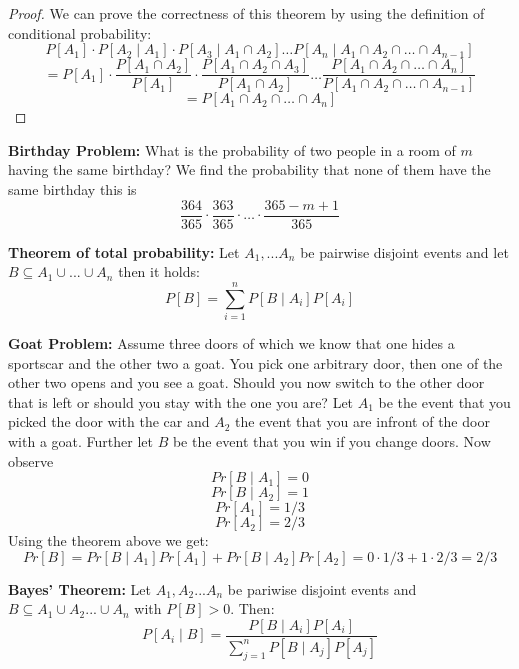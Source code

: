 \begin{proof}
	We can prove the correctness of this theorem by using the definition of conditional probability:
	$$P[A_1] \cdot P[A_2 \mid A_1] \cdot P[A_3 \mid A_1 \cap A_2] \dots P[A_n \mid A_1 \cap A_2 \cap \dots \cap A_{n-1}]$$
	$$ = P[A_1] \cdot \frac{P[A_1 \cap A_2]}{P[A_1]} \cdot \frac{P[A_1 \cap A_2 \cap A_3]}{P[A_1 \cap A_2]} \dots \frac{P[A_1 \cap A_2 \cap \dots \cap A_n]}{P[A_1 \cap A_2 \cap \dots \cap A_{n-1}]}$$
	$$ = P[A_1 \cap A_2 \cap \dots \cap A_n]$$
\end{proof}

\begin{example}
	\textbf{Birthday Problem: } What is the probability of two people in a room of $m$ having the same birthday? We find the probability that none of them have the same birthday this is
	$$\frac{364}{365} \cdot \frac{363}{365} \cdot \dots \cdot \frac{365-m+1}{365}$$
\end{example}

\begin{theorem}
	\textbf{Theorem of total probability: }Let $A_1, ... A_n$ be pairwise disjoint events and let $B \subseteq A_1 \cup ... \cup A_n$ then it holds:
	$$P[B] = \sum_{i=1}^n P[B \mid A_i] P[A_i]$$
\end{theorem}

\begin{example}
	\textbf{Goat Problem: } Assume three doors of which we know that one hides a sportscar and the other two a goat. You pick one arbitrary door, then one of the other two opens and you see a goat. Should you now switch to the other door that is left or should you stay with the one you are?
	Let $A_1$ be the event that you picked the door with the car and $A_2$ the event that you are infront of the door with a goat. Further let $B$ be the event that you win if you change doors. Now observe
	$$Pr[B \mid A_1] = 0$$
	$$Pr[B \mid A_2] = 1$$
	$$Pr[A_1] = 1/3$$
	$$Pr[A_2] = 2/3$$
	Using the theorem above we get:
	$$Pr[B] = Pr[B \mid A_1] Pr[A_1] + Pr[B \mid A_2] Pr[A_2] = 0 \cdot 1/3 + 1 \cdot 2/3 = 2/3$$
\end{example}

\begin{theorem}
	\textbf{Bayes' Theorem: } Let $A_1, A_2 ... A_n$ be pariwise disjoint events and $B \subseteq A_1 \cup A_2 ... \cup A_n$ with $P[B] > 0$. Then:
	$$P[A_i \mid B] = \frac{P[B \mid A_i] P[A_i]}{\sum_{j=1}^n P[B \mid A_j] P[A_j]}$$
\end{theorem}

